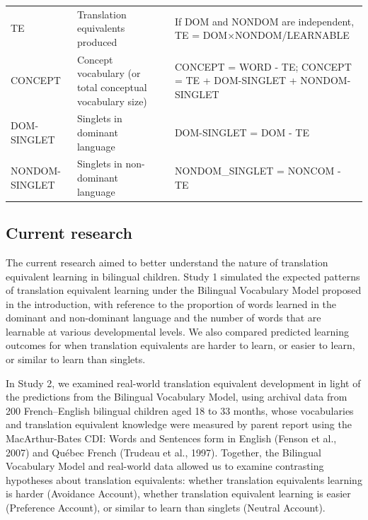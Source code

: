 \documentclass[
  english,
  ,man,floatsintext]{apa6}
\begin{document}
\begin{landscape}
\begin{table}
\begin{tabular}[t]{l>{\raggedright\arraybackslash}p{175px}>{\raggedright\arraybackslash}p{175px}>{\raggedright\arraybackslash}p{175px}}
\hspace{1em}TE & Translation equivalents produced &  & If DOM and NONDOM are independent, TE = DOM×NONDOM/LEARNABLE\\
\hspace{1em}CONCEPT & Concept vocabulary (or total conceptual vocabulary size) &  & CONCEPT = WORD - TE; CONCEPT = TE + DOM-SINGLET + NONDOM-SINGLET\\
\hspace{1em}DOM-SINGLET & Singlets in dominant language &  & DOM-SINGLET = DOM - TE\\
\hspace{1em}NONDOM-SINGLET & Singlets in non-dominant language &  & NONDOM\_SINGLET = NONCOM - TE\\
\bottomrule
\end{tabular}
\end{table}
\end{landscape}

\hypertarget{current-research}{%
\subsection{Current research}\label{current-research}}

The current research aimed to better understand the nature of translation equivalent learning in bilingual children. Study 1 simulated the expected patterns of translation equivalent learning under the Bilingual Vocabulary Model proposed in the introduction, with reference to the proportion of words learned in the dominant and non-dominant language and the number of words that are learnable at various developmental levels. We also compared predicted learning outcomes for when translation equivalents are harder to learn, or easier to learn, or similar to learn than singlets.

In Study 2, we examined real-world translation equivalent development in light of the predictions from the Bilingual Vocabulary Model, using archival data from 200 French--English bilingual children aged 18 to 33 months, whose vocabularies and translation equivalent knowledge were measured by parent report using the MacArthur-Bates CDI: Words and Sentences form in English (Fenson et al., 2007) and Québec French (Trudeau et al., 1997). Together, the Bilingual Vocabulary Model and real-world data allowed us to examine contrasting hypotheses about translation equivalents: whether translation equivalents learning is harder (Avoidance Account), whether translation equivalent learning is easier (Preference Account), or similar to learn than singlets (Neutral Account).
\end{document}
